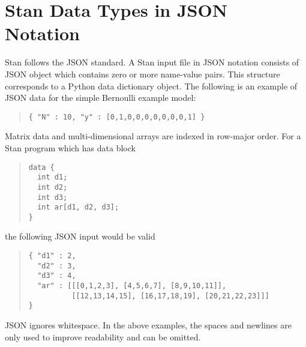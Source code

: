 \section{Stan Data Types in JSON Notation}

Stan follows the JSON standard.
A Stan input file in  JSON notation consists of  JSON object which contains zero
or more name-value pairs.  This structure corresponds to a Python data
dictionary object.  The following is an example of JSON data for the
simple Bernoulli example model:
\begin{quote}
\begin{Verbatim}
{ "N" : 10, "y" : [0,1,0,0,0,0,0,0,0,1] }
\end{Verbatim}
\end{quote}
Matrix data and multi-dimensional arrays are indexed in row-major
order.  For a Stan program which has data block
\begin{quote}
\begin{Verbatim}
data {
  int d1;
  int d2;
  int d3;
  int ar[d1, d2, d3];
}
\end{Verbatim}
\end{quote}
\noindent
the following JSON input would be valid
\begin{quote}
\begin{Verbatim}
{ "d1" : 2,
  "d2" : 3,
  "d3" : 4,
  "ar" : [[[0,1,2,3], [4,5,6,7], [8,9,10,11]],
          [[12,13,14,15], [16,17,18,19], [20,21,22,23]]]
}
\end{Verbatim}
\end{quote}
JSON ignores whitespace. In the above examples,  the spaces and
newlines are only used to improve readability and can be omitted.


